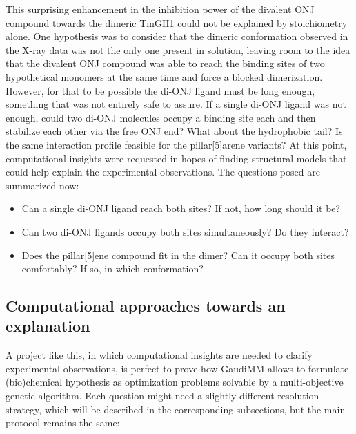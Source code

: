 This surprising enhancement in the inhibition power of the divalent ONJ compound towards the dimeric TmGH1 could not be explained by stoichiometry alone. One hypothesis was to consider that the dimeric conformation observed in the X-ray data was not the only one present in solution, leaving room to the idea that the divalent ONJ compound was able to reach the binding sites of two hypothetical monomers at the same time and force a blocked dimerization. However, for that to be possible the di-ONJ ligand must be long enough, something that was not entirely safe to assure. If a single di-ONJ ligand was not enough, could two di-ONJ molecules occupy a binding site each and then stabilize each other via the free ONJ end? What about the hydrophobic tail? Is the same interaction profile feasible for the pillar[5]arene variants? At this point, computational insights were requested in hopes of finding structural models that could help explain the experimental observations. The questions posed are summarized now:

\begin{itemize}
	\item Can a single di-ONJ ligand reach both sites? If not, how long should it be?
	\item Can two di-ONJ ligands occupy both sites simultaneously? Do they interact?
	\item Does the pillar[5]ene compound fit in the dimer? Can it occupy both sites comfortably? If so, in which conformation?
\end{itemize}

\subsection{Computational approaches towards an explanation}
A project like this, in which computational insights are needed to clarify experimental observations, is perfect to prove how GaudiMM allows to formulate (bio)chemical hypothesis as optimization problems solvable by a multi-objective genetic algorithm. Each question might need a slightly different resolution strategy, which will be described in the corresponding subsections, but the main protocol remains the same:


